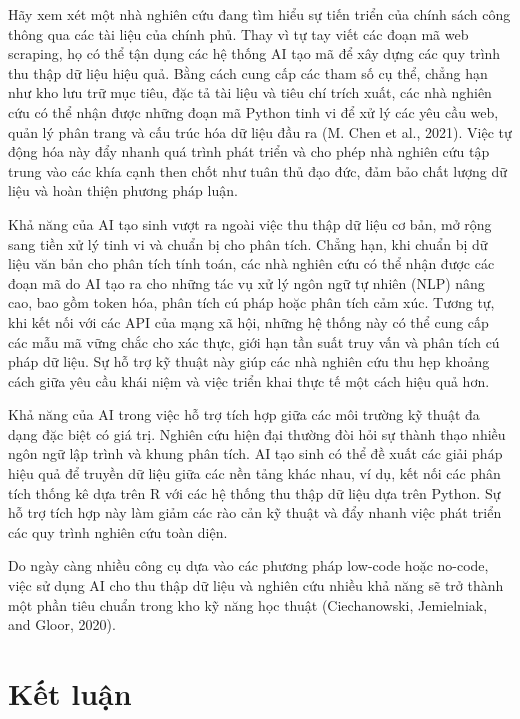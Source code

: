 Hãy xem xét một nhà nghiên cứu đang tìm hiểu sự tiến triển của chính sách công thông qua các tài liệu của chính phủ. Thay vì tự tay viết các đoạn mã web scraping, họ có thể tận dụng các hệ thống AI tạo mã để xây dựng các quy trình thu thập dữ liệu hiệu quả. Bằng cách cung cấp các tham số cụ thể, chẳng hạn như kho lưu trữ mục tiêu, đặc tả tài liệu và tiêu chí trích xuất, các nhà nghiên cứu có thể nhận được những đoạn mã Python tinh vi để xử lý các yêu cầu web, quản lý phân trang và cấu trúc hóa dữ liệu đầu ra (M. Chen et al., 2021). Việc tự động hóa này đẩy nhanh quá trình phát triển và cho phép nhà nghiên cứu tập trung vào các khía cạnh then chốt như tuân thủ đạo đức, đảm bảo chất lượng dữ liệu và hoàn thiện phương pháp luận.

Khả năng của AI tạo sinh vượt ra ngoài việc thu thập dữ liệu cơ bản, mở rộng sang tiền xử lý tinh vi và chuẩn bị cho phân tích. Chẳng hạn, khi chuẩn bị dữ liệu văn bản cho phân tích tính toán, các nhà nghiên cứu có thể nhận được các đoạn mã do AI tạo ra cho những tác vụ xử lý ngôn ngữ tự nhiên (NLP) nâng cao, bao gồm token hóa, phân tích cú pháp hoặc phân tích cảm xúc. Tương tự, khi kết nối với các API của mạng xã hội, những hệ thống này có thể cung cấp các mẫu mã vững chắc cho xác thực, giới hạn tần suất truy vấn và phân tích cú pháp dữ liệu. Sự hỗ trợ kỹ thuật này giúp các nhà nghiên cứu thu hẹp khoảng cách giữa yêu cầu khái niệm và việc triển khai thực tế một cách hiệu quả hơn.

Khả năng của AI trong việc hỗ trợ tích hợp giữa các môi trường kỹ thuật đa dạng đặc biệt có giá trị. Nghiên cứu hiện đại thường đòi hỏi sự thành thạo nhiều ngôn ngữ lập trình và khung phân tích. AI tạo sinh có thể đề xuất các giải pháp hiệu quả để truyền dữ liệu giữa các nền tảng khác nhau, ví dụ, kết nối các phân tích thống kê dựa trên R với các hệ thống thu thập dữ liệu dựa trên Python. Sự hỗ trợ tích hợp này làm giảm các rào cản kỹ thuật và đẩy nhanh việc phát triển các quy trình nghiên cứu toàn diện.

Do ngày càng nhiều công cụ dựa vào các phương pháp low-code hoặc no-code, việc sử dụng AI cho thu thập dữ liệu và nghiên cứu nhiều khả năng sẽ trở thành một phần tiêu chuẩn trong kho kỹ năng học thuật (Ciechanowski, Jemielniak, and Gloor, 2020).

\section{Kết luận}

